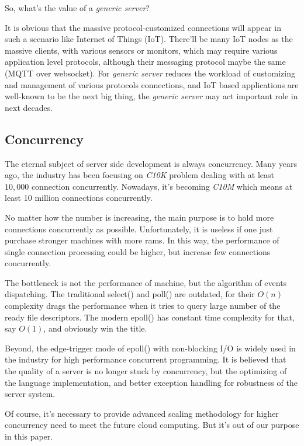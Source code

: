 \documentclass[numbers,numberedpars]{sigplanconf}
\begin{document}
So, what's the value of a {\it generic server}?

It is obvious that the massive protocol-customized connections will appear in such a scenario like Internet of Things (IoT).
There'll be many IoT nodes as the massive clients, with various sensors or monitors, which may require various application level protocols,
although their messaging protocol maybe the same (MQTT over websocket).
For {\it generic server} reduces the workload of customizing and management of various protocols connections, and IoT based applications are
well-known to be the next big thing, the {\it generic server} may act important role in next decades. 

\subsection{Concurrency} \label{Concurrency}

The eternal subject of server side development is always concurrency.
Many years ago, the industry has been focusing on {\it C10K} problem dealing with at least $10,000$ connection concurrently.
Nowadays, it's becoming {\it C10M} which means at least 10 million connections concurrently.

No matter how the number is increasing, the main purpose is to hold more connections concurrently as possible.
Unfortunately, it is useless if one just purchase stronger machines with more rams. In this way, the performance of single connection
processing could be higher, but increase few connections concurrently.

The bottleneck is not the performance of machine, but the algorithm of events dispatching. The traditional select() and poll() are outdated,
for their $O(n)$ complexity drags the performance when it tries to query large number of the ready file descriptors. The modern epoll() has
constant time complexity for that, say $O(1)$, and obviously win the title.

Beyond, the edge-trigger mode of epoll() with non-blocking I/O is widely used in the industry for high performance concurrent programming.
It is believed that the quality of a server is no longer stuck by concurrency, but the optimizing of the language implementation,
and better exception handling for robustness of the server system.

Of course, it's necessary to provide advanced scaling methodology for higher concurrency need to meet the future cloud computing. But it's
out of our purpose in this paper.
\end{document}
